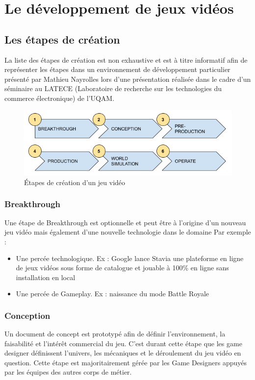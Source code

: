 \chapter{Le développement de jeux vidéos}
 
 
\section{Les étapes de création}
La liste des étapes de création est non exhaustive et est à titre informatif afin de représenter les étapes dans un environnement de développement particulier présenté par Mathieu Nayrolles lors d'une présentation réalisée dans le cadre d'un séminaire au LATECE (Laboratoire de recherche sur les technologies du commerce électronique) de l'UQAM.
\begin{figure}[H]
    \centering
    \includegraphics[width=14cm]{10_img/production_stages.png} 
    \caption{Étapes de création d'un jeu vidéo}
\end{figure}
\subsection{Breakthrough}
Une étape de Breakthrough est optionnelle et peut être à l'origine d'un nouveau jeu vidéo mais également d'une nouvelle technologie dans le domaine
Par exemple :
\begin{itemize}
    \item Une percée technologique. Ex : Google lance Stavia une plateforme en ligne de jeux vidéos sous forme de catalogue et jouable à 100\% en ligne sans installation en local
    \item Une percée de Gameplay. Ex : naissance du mode Battle Royale
\end{itemize}

\subsection{Conception}
Un document de concept est prototypé afin de définir l'environnement, la faisabilité et l'intérêt commercial du jeu. C'est durant cette étape que les game designer définissent l'univers, les mécaniques et le déroulement du jeu vidéo en question. Cette étape est majoritairement gérée par les Game Designers appuyés par les équipes des autres corps de métier.


